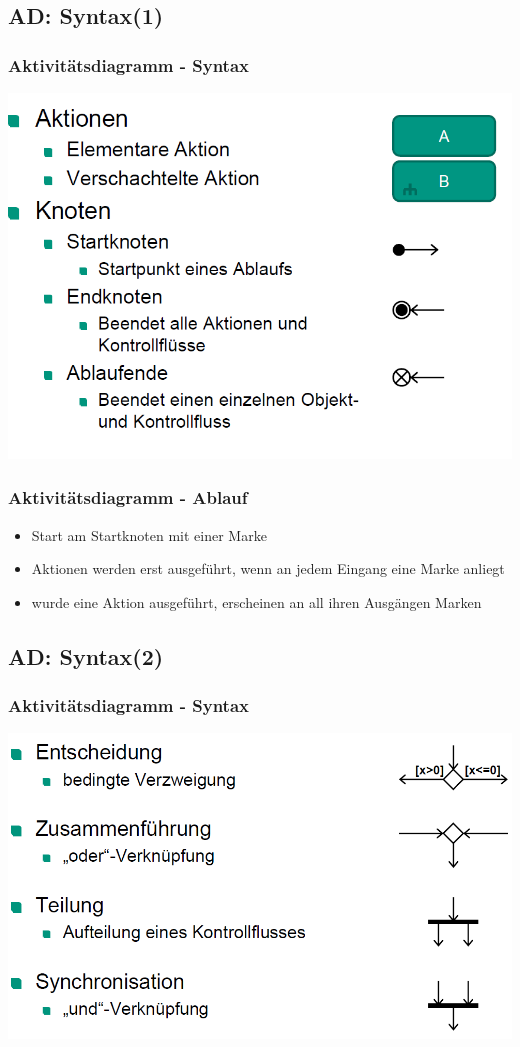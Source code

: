 \documentclass[18pt]{beamer}
\begin{document}
	\subsection{AD: Syntax(1)}
	\begin{frame}
		\frametitle{Aktivitätsdiagramm - Syntax}
		\includegraphics[scale=0.45]{./pics/tut2/act_syn1.png}
	\end{frame}

	\begin{frame}
	\frametitle{Aktivitätsdiagramm - Ablauf}
	\begin{itemize}
		\item Start am Startknoten mit einer Marke
		\item Aktionen werden erst ausgeführt, wenn an jedem Eingang eine Marke anliegt
		\item wurde eine Aktion ausgeführt, erscheinen an all ihren Ausgängen Marken
	\end{itemize}
	\end{frame}

	\subsection{AD: Syntax(2)}
	\begin{frame}
		\frametitle{Aktivitätsdiagramm - Syntax}
		\includegraphics[scale=0.45]{./pics/tut2/act_syn2.png}
	\end{frame}
\end{document}
